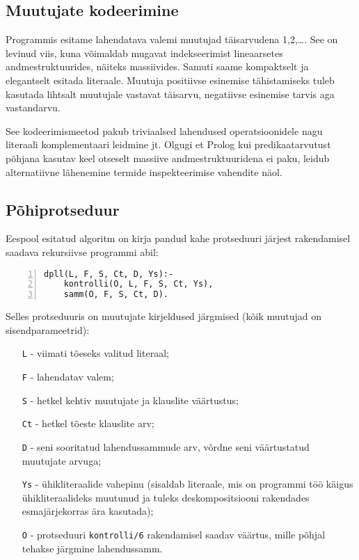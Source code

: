 \subsection{Muutujate kodeerimine}

Programmis esitame lahendatava valemi muutujad täisarvudena 1,2,\ldots. See on
levinud viis, kuna võimaldab mugavat indekseerimist lineaarsetes andmestruktuurides,
näiteks massiivides. Samuti saame kompaktselt ja elegantselt esitada literaale.
Muutuja positiivse esinemise tähistamiseks tuleb kasutada lihtsalt
muutujale vastavat täisarvu, negatiivse esinemise tarvis aga vastandarvu.

See kodeerimismeetod pakub triviaalsed lahendused operatsioonidele nagu
literaali komplementaari leidmine jt. Olgugi et Prolog kui predikaatarvutust
põhjana kasutav keel otseselt massiive andmestruktuuridena ei paku, leidub
alternatiivne lähenemine termide inspekteerimise vahendite näol. 

\subsection{Põhiprotseduur}

Eespool esitatud algoritm  on kirja pandud
kahe protseduuri järjest rakendamisel saadava rekursiivse programmi abil:

\begin{lstlisting}[numbers=left,xleftmargin=1cm,basicstyle=\tt]
dpll(L, F, S, Ct, D, Ys):-
	kontrolli(O, L, F, S, Ct, Ys),
	samm(O, F, S, Ct, D).
\end{lstlisting}

Selles protseduuris on muutujate kirjeldused järgmised (kõik muutujad on
sisendparameetrid):

\begin{itemize}
  \setlength{\itemsep}{1mm}
  \item [\texttt{L} -] viimati tõeseks valitud literaal;
  \item [\texttt{F} -] lahendatav valem;
  \item [\texttt{S} -] hetkel kehtiv muutujate ja klauslite väärtustus;
  \item [\texttt{Ct} -] hetkel tõeste klauslite arv;
  \item [\texttt{D} -] seni sooritatud lahendussammude arv, võrdne seni
  väärtustatud muutujate arvuga;
  \item [\texttt{Ys} -] ühikliteraalide vahepinu (sisaldab literaale, mis on
  programmi töö käigus ühikliteraalideks muutunud ja tuleks deskompositsiooni
  rakendades esmajärjekorras ära kasutada);
  \item [\texttt{O} -] protseduuri \texttt{kontrolli/6} rakendamisel saadav
  väärtus, mille põhjal tehakse järgmine lahendussamm.
\end{itemize}

